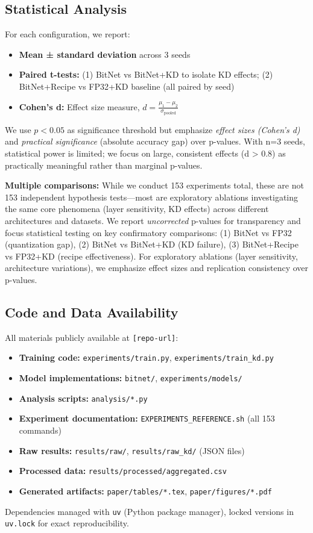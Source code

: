 \subsection{Statistical Analysis}
\label{sec:methods:statistics}

For each configuration, we report:
\begin{itemize}
    \item \textbf{Mean ± standard deviation} across 3 seeds
    \item \textbf{Paired t-tests:} (1) BitNet vs BitNet+KD to isolate KD effects; (2) BitNet+Recipe vs FP32+KD baseline (all paired by seed)
    \item \textbf{Cohen's d:} Effect size measure, $d = \frac{\mu_1 - \mu_2}{\sigma_{\text{pooled}}}$
\end{itemize}

We use $p < 0.05$ as significance threshold but emphasize \textit{effect sizes (Cohen's d)} and \textit{practical significance} (absolute accuracy gap) over p-values. With n=3 seeds, statistical power is limited; we focus on large, consistent effects (d > 0.8) as practically meaningful rather than marginal p-values.

\textbf{Multiple comparisons:} While we conduct 153 experiments total, these are not 153 independent hypothesis tests—most are exploratory ablations investigating the same core phenomena (layer sensitivity, KD effects) across different architectures and datasets. We report \textit{uncorrected} p-values for transparency and focus statistical testing on key confirmatory comparisons: (1) BitNet vs FP32 (quantization gap), (2) BitNet vs BitNet+KD (KD failure), (3) BitNet+Recipe vs FP32+KD (recipe effectiveness). For exploratory ablations (layer sensitivity, architecture variations), we emphasize effect sizes and replication consistency over p-values.

\subsection{Code and Data Availability}
\label{sec:methods:availability}

All materials publicly available at \texttt{[repo-url]}:
\begin{itemize}
    \item \textbf{Training code:} \texttt{experiments/train.py}, \texttt{experiments/train\_kd.py}
    \item \textbf{Model implementations:} \texttt{bitnet/}, \texttt{experiments/models/}
    \item \textbf{Analysis scripts:} \texttt{analysis/*.py}
    \item \textbf{Experiment documentation:} \texttt{EXPERIMENTS\_REFERENCE.sh} (all 153 commands)
    \item \textbf{Raw results:} \texttt{results/raw/}, \texttt{results/raw\_kd/} (JSON files)
    \item \textbf{Processed data:} \texttt{results/processed/aggregated.csv}
    \item \textbf{Generated artifacts:} \texttt{paper/tables/*.tex}, \texttt{paper/figures/*.pdf}
\end{itemize}

Dependencies managed with \texttt{uv} (Python package manager), locked versions in \texttt{uv.lock} for exact reproducibility.
